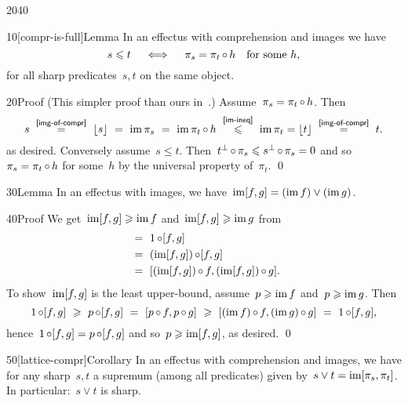 \begin{parsec}{2040}%
\begin{point}{10}[compr-is-full]{Lemma}%
In an effectus with comprehension and images
    we have
\begin{equation*}
    s \leqslant t
    \quad \iff \quad
    \pi_s = \pi_t \mathop{\circ} h
    \quad \text{for some $h$},
\end{equation*}
for all sharp predicates~$s,t$ on the same object.
\begin{point}{20}{Proof}%
(This simpler proof than ours in~\cite{effintro}.)
Assume~$\pi_s = \pi_t \mathop{\circ} h$.
Then
\begin{equation*}
    s \ \overset{\sref{img-of-compr}}{=}\  \floor{s} \ =\  \IM \pi_s \  = \ \IM \pi_t \after h
    \ \overset{\sref{im-ineq}}{\leq} \ \IM \pi_t = \floor{t} 
            \ \overset{\sref{img-of-compr}}{=} \ t.
\end{equation*}
as desired.
Conversely assume~$s \leq t$.
Then~$t^\perp \mathop{\circ} \pi_s \leqslant s^\perp \mathop{\circ} \pi_s = 0$
    and so~$\pi_s = \pi_t \mathop{\circ} h$
    for some~$h$ by the universal property of~$\pi_t$. \qed
\end{point}
\end{point}
\begin{point}{30}{Lemma}%
In an effectus with images,
    we have~$\operatorname{im} [f,g] = (\operatorname{im} f) \vee (\operatorname{im} g)$.
\begin{point}{40}{Proof}%
We get~$\operatorname{im}[f,g] \geqslant \operatorname{im} f$ and~$\operatorname{im}[f,g] \geqslant \operatorname{im}  g$
    from
\begin{align*}
    [1 \after f, 1 \after g] 
        &\ =\  1 \after [f,g]  \\ 
        &\ =\ (\IM [f,g]) \after [f,g] \\
        & \ = \  [(\IM [f,g]) \after f, (\IM [f,g]) \after g].
\end{align*}
To show~$\operatorname{im} [f,g]$ is the least upper-bound,
assume~$p \geqslant \operatorname{im} f$ and~$p \geqslant \operatorname{im} g$.
Then
\begin{equation*}
    1 \mathop{\circ} [f,g] \ \geqslant\ p \mathop{\circ} [f,g] \ =\  [p \mathop{\circ} f, p \mathop{\circ} g]
                    \ \geqslant\  [(\operatorname{im} f) \mathop{\circ} f, (\operatorname{im} g)\mathop{\circ} g]
                    \ = \ 1 \mathop{\circ} [f,g],
\end{equation*}
    hence~$1 \mathop{\circ} [f,g] = p \mathop{\circ} [f,g]$
    and so~$p \geqslant \operatorname{im} [f,g]$, as desired. \qed
\end{point}
\begin{point}{50}[lattice-compr]{Corollary}%
In an effectus with comprehension and images,
we have for any sharp~$s,t$
    a supremum (among all predicates)
    given by~$s \vee t = \operatorname{im}[\pi_s, \pi_t]$.
    In particular:~$s \vee t$ is sharp.
\end{point}
\end{point}
\end{parsec}

